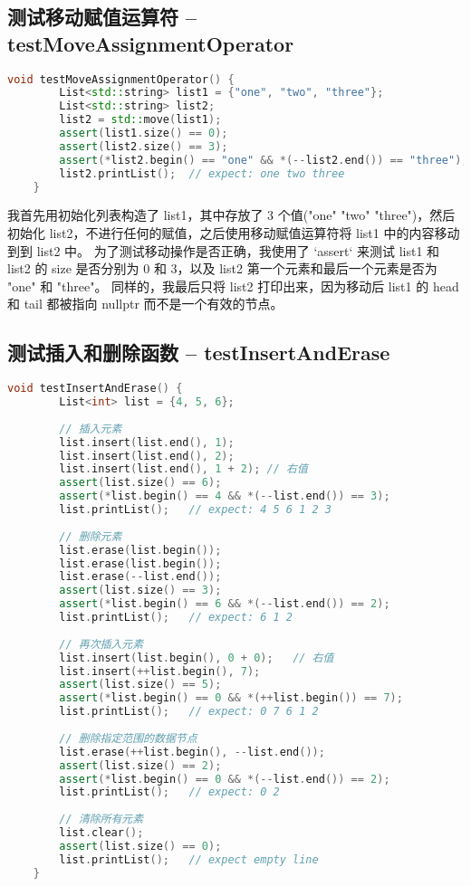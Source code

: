 \documentclass[UTF8]{ctexart}
\begin{document}
\subsection{测试移动赋值运算符 -- testMoveAssignmentOperator}
\begin{lstlisting}[language=c++, breaklines=true, keywordstyle=\color{blue!70}, commentstyle=\color{red!50!green!50!blue!50}, frame=shadowbox, rulesepcolor=\color{red!20!green!20!blue!20}]
    void testMoveAssignmentOperator() {
        List<std::string> list1 = {"one", "two", "three"};
        List<std::string> list2;
        list2 = std::move(list1);
        assert(list1.size() == 0);
        assert(list2.size() == 3);
        assert(*list2.begin() == "one" && *(--list2.end()) == "three");
        list2.printList();  // expect: one two three
    }
\end{lstlisting}

我首先用初始化列表构造了 list1，其中存放了 3 个值("one" "two" "three")，然后初始化 list2，不进行任何的赋值，之后使用移动赋值运算符将 list1 中的内容移动到到 list2 中。
为了测试移动操作是否正确，我使用了 `assert` 来测试 list1 和 list2 的 size 是否分别为 0 和 3，以及 list2 第一个元素和最后一个元素是否为 "one" 和 "three"。
同样的，我最后只将 list2 打印出来，因为移动后 list1 的 head 和 tail 都被指向 nullptr 而不是一个有效的节点。

\subsection{测试插入和删除函数 -- testInsertAndErase}
\begin{lstlisting}[language=c++, breaklines=true, keywordstyle=\color{blue!70}, commentstyle=\color{red!50!green!50!blue!50}, frame=shadowbox, rulesepcolor=\color{red!20!green!20!blue!20}]
    void testInsertAndErase() {
        List<int> list = {4, 5, 6};
        
        // 插入元素
        list.insert(list.end(), 1);
        list.insert(list.end(), 2);
        list.insert(list.end(), 1 + 2); // 右值
        assert(list.size() == 6);
        assert(*list.begin() == 4 && *(--list.end()) == 3);
        list.printList();   // expect: 4 5 6 1 2 3
    
        // 删除元素
        list.erase(list.begin());
        list.erase(list.begin());
        list.erase(--list.end());
        assert(list.size() == 3);
        assert(*list.begin() == 6 && *(--list.end()) == 2);
        list.printList();   // expect: 6 1 2
    
        // 再次插入元素
        list.insert(list.begin(), 0 + 0);   // 右值
        list.insert(++list.begin(), 7);
        assert(list.size() == 5);
        assert(*list.begin() == 0 && *(++list.begin()) == 7);
        list.printList();   // expect: 0 7 6 1 2
    
        // 删除指定范围的数据节点
        list.erase(++list.begin(), --list.end());
        assert(list.size() == 2);
        assert(*list.begin() == 0 && *(--list.end()) == 2);
        list.printList();   // expect: 0 2
    
        // 清除所有元素
        list.clear();
        assert(list.size() == 0);
        list.printList();   // expect empty line
    }
\end{lstlisting}
\end{document}
